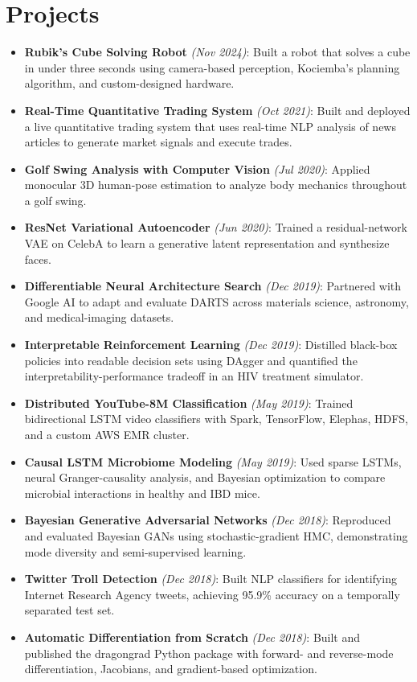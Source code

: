 \documentclass[a4paper,11pt]{article}
\newcommand{\resumeItem}[1]{
  \item\small{#1}
}
\newcommand{\resumeItemListStart}{
  \begin{itemize}[rightmargin=0.11in, itemsep=1.5pt, topsep=4pt, parsep=0pt, partopsep=0pt]
}
\newcommand{\resumeItemListEnd}{\end{itemize}}
\begin{document}
\section{Projects}
\resumeItemListStart
      \resumeItem{\textbf{Rubik's Cube Solving Robot} \textit{(Nov 2024)}: Built a robot that solves a cube in under three seconds using camera-based perception, Kociemba's planning algorithm, and custom-designed hardware.}
      \resumeItem{\textbf{Real-Time Quantitative Trading System} \textit{(Oct 2021)}: Built and deployed a live quantitative trading system that uses real-time NLP analysis of news articles to generate market signals and execute trades.}
      \resumeItem{\textbf{Golf Swing Analysis with Computer Vision} \textit{(Jul 2020)}: Applied monocular 3D human-pose estimation to analyze body mechanics throughout a golf swing.}
      \resumeItem{\textbf{ResNet Variational Autoencoder} \textit{(Jun 2020)}: Trained a residual-network VAE on CelebA to learn a generative latent representation and synthesize faces.}
      \resumeItem{\textbf{Differentiable Neural Architecture Search} \textit{(Dec 2019)}: Partnered with Google AI to adapt and evaluate DARTS across materials science, astronomy, and medical-imaging datasets.}
      \resumeItem{\textbf{Interpretable Reinforcement Learning} \textit{(Dec 2019)}: Distilled black-box policies into readable decision sets using DAgger and quantified the interpretability-performance tradeoff in an HIV treatment simulator.}
      \resumeItem{\textbf{Distributed YouTube-8M Classification} \textit{(May 2019)}: Trained bidirectional LSTM video classifiers with Spark, TensorFlow, Elephas, HDFS, and a custom AWS EMR cluster.}
      \resumeItem{\textbf{Causal LSTM Microbiome Modeling} \textit{(May 2019)}: Used sparse LSTMs, neural Granger-causality analysis, and Bayesian optimization to compare microbial interactions in healthy and IBD mice.}
      \resumeItem{\textbf{Bayesian Generative Adversarial Networks} \textit{(Dec 2018)}: Reproduced and evaluated Bayesian GANs using stochastic-gradient HMC, demonstrating mode diversity and semi-supervised learning.}
      \resumeItem{\textbf{Twitter Troll Detection} \textit{(Dec 2018)}: Built NLP classifiers for identifying Internet Research Agency tweets, achieving 95.9\% accuracy on a temporally separated test set.}
      \resumeItem{\textbf{Automatic Differentiation from Scratch} \textit{(Dec 2018)}: Built and published the dragongrad Python package with forward- and reverse-mode differentiation, Jacobians, and gradient-based optimization.}
\resumeItemListEnd
\end{document}
